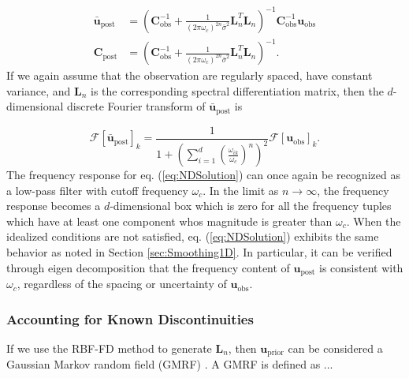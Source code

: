 \documentclass[10pt,a4paper]{article}
\begin{document}
\begin{equation}\label{eq:NDSolution}
\begin{split}
\mathbf{\bar{u}}_\mathrm{post} &= (\mathbf{C}_\mathrm{obs}^{-1} +   
                   \frac{1}{(2\pi\omega_c)^{2n}\bar{\sigma}^2}\mathbf{L}_n^T\mathbf{L}_n)^{-1}\mathbf{C}_\mathrm{obs}^{-1}
                   \mathbf{u}_\mathrm{obs}
\\
\mathbf{C}_\mathrm{post} &= (\mathbf{C}_\mathrm{obs}^{-1} +   
                            \frac{1}{(2\pi\omega_c)^{2n}\bar{\sigma}^2}\mathbf{L}_n^T\mathbf{L}_n)^{-1}.
\end{split}
\end{equation}
If we again assume that the observation are regularly spaced, have constant variance, and $\mathbf{L}_n$ is the corresponding spectral differentiation matrix, then the $d$-dimensional discrete Fourier transform of $\mathbf{\bar{u}}_\mathrm{post}$ is 

\begin{equation}\label{eq:NDFourierSoln}
  \mathcal{F}\left[\mathbf{\bar{u}}_\mathrm{post}\right]_k = 
  \frac{1}{1 + \left(\sum_{i=1}^d \left(\frac{\omega_{ik}}{\omega_c}\right)^n\right)^2} \mathcal{F}\left[\mathbf{u}_\mathrm{obs}\right]_k.
\end{equation}
The frequency response for eq. (\ref{eq:NDSolution}) can once again be recognized as a low-pass filter with cutoff frequency $\omega_c$.  In the limit as $n \to \infty$, the frequency response becomes a $d$-dimensional box which is zero for all the frequency tuples which have at least one component whos magnitude is greater than $\omega_c$. 
When the idealized conditions are not satisfied, eq. (\ref{eq:NDSolution}) exhibits the same behavior as noted in Section \ref{sec:Smoothing1D}. In particular, it can be verified through eigen decomposition that the frequency content of $\mathbf{u}_\mathrm{post}$ is consistent with $\omega_c$, regardless of the spacing or uncertainty of $\mathbf{u}_\mathrm{obs}$.

   
\subsubsection{Accounting for Known Discontinuities}\label{sec:Discontinuities}

If we use the RBF-FD method to generate $\mathbf{L}_n$, then $\mathbf{u}_\mathrm{prior}$ can be considered a Gaussian Markov random field (GMRF) \citep[e.g.][]{Rue2005}.  A GMRF is defined as ...
\end{document}
